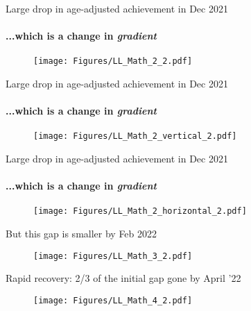 \documentclass[aspectratio=169,numbering=none]{beamer}
\begin{document}
\begin{frame}[plain]{Large drop in age-adjusted achievement in Dec 2021}
\framesubtitle{...which is a change in \textit{gradient}}
\begin{figure}[H]
\begin{center}
\texttt{[image: Figures/LL\_Math\_2\_2.pdf]} 
\end{center}
\end{figure}
\end{frame}

\begin{frame}[plain]{Large drop in age-adjusted achievement in Dec 2021}
\framesubtitle{...which is a change in \textit{gradient}}
\begin{figure}[H]
\begin{center}
\texttt{[image: Figures/LL\_Math\_2\_vertical\_2.pdf]} 
\end{center}
\end{figure}
\end{frame}

\begin{frame}[plain]{Large drop in age-adjusted achievement in Dec 2021}
\framesubtitle{...which is a change in \textit{gradient}}
\begin{figure}[H]
\begin{center}
\texttt{[image: Figures/LL\_Math\_2\_horizontal\_2.pdf]} 
\end{center}
\end{figure}
\end{frame}

\begin{frame}[plain]{But this gap is smaller by Feb 2022}
\begin{figure}[H]
\begin{center}
\texttt{[image: Figures/LL\_Math\_3\_2.pdf]} 
\end{center}
\end{figure}
\end{frame}

\begin{frame}[plain]{Rapid recovery: 2/3 of the initial gap gone by April '22}
\begin{figure}[H]
\begin{center}
\texttt{[image: Figures/LL\_Math\_4\_2.pdf]} 
\end{center}
\end{figure}
\end{frame}
\end{document}
